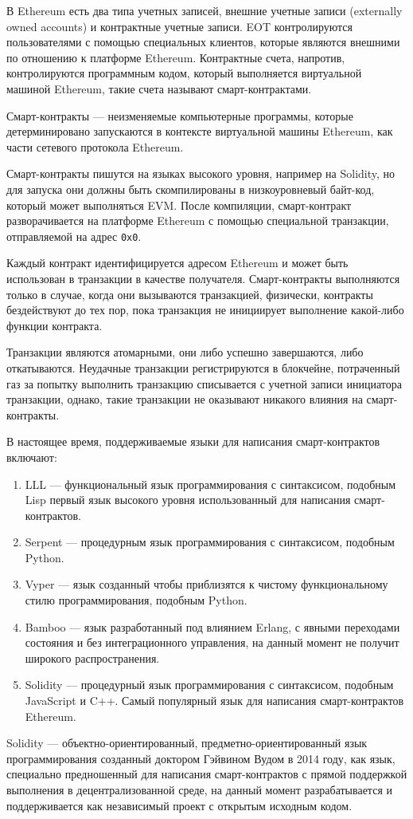 В Ethereum есть два типа учетных записей, внешние учетные записи (externally owned accounts) и контрактные учетные записи. EOT контролируются пользователями с помощью специальных клиентов, которые являются внешними по отношению к платформе Ethereum. Контрактные счета, напротив, контролируются программным кодом, который выполняется виртуальной машиной Ethereum, такие счета называют смарт-контрактами.

Смарт-контракты — неизменяемые компьютерные программы, которые детерминировано запускаются в контексте виртуальной машины Ethereum, как части сетевого протокола Ethereum.

Смарт-контракты пишутся на языках высокого уровня, например на Solidity, но для запуска они должны быть скомпилированы в низкоуровневый байт-код, который может выполняться EVM. После компиляции, смарт-контракт разворачивается на платформе Ethereum с помощью специальной транзакции, отправляемой на адрес \verb|0x0|.

Каждый контракт идентифицируется адресом Ethereum и может быть использован в транзакции в качестве получателя. Смарт-контракты выполняются только в случае, когда они вызываются транзакцией, физически, контракты бездействуют до тех пор, пока транзакция не инициирует выполнение какой-либо функции контракта.

Транзакции являются атомарными, они либо успешно завершаются, либо откатываются. Неудачные транзакции регистрируются в блокчейне, потраченный газ за попытку выполнить транзакцию списывается с учетной записи инициатора транзакции, однако, такие транзакции не оказывают никакого влияния на смарт-контракты.

В настоящее время, поддерживаемые языки для написания смарт-контрактов включают:

\begin{enumerate} 
  \item LLL — функциональный язык программирования с синтаксисом, подобным Lisp первый язык высокого уровня использованный для написания смарт-контрактов.
  
  \item Serpent — процедурным язык программирования с синтаксисом, подобным Python.
  
  \item Vyper — язык созданный чтобы приблизятся к чистому функциональному стилю программирования, подобным Python.
  
  \item Bamboo — язык разработанный под влиянием Erlang, с явными переходами состояния и без интеграционного управления, на данный момент не получит широкого распространения.
  
  \item Solidity — процедурный язык программирования с синтаксисом, подобным JavaScript и C++. Самый популярный язык для написания смарт-контрактов Ethereum.
\end{enumerate}

Solidity — объектно-ориентированный, предметно-ориентированный язык программирования созданный доктором Гэйвином Вудом в 2014 году, как язык, специально предношенный для написания смарт-контрактов с прямой поддержкой выполнения в децентрализованной среде, на данный момент разрабатывается и поддерживается как независимый проект с открытым исходным кодом.